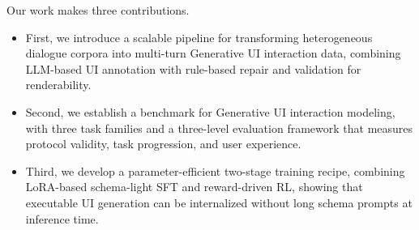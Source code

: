 Our work makes three contributions. 

\begin{itemize}
    \item First, we introduce a scalable pipeline for transforming heterogeneous dialogue corpora into multi-turn Generative UI interaction data, combining LLM-based UI annotation with rule-based repair and validation for renderability.
    \item Second, we establish a benchmark for Generative UI interaction modeling, with three task families and a three-level evaluation framework that measures protocol validity, task progression, and user experience.
    \item Third, we develop a parameter-efficient two-stage training recipe, combining LoRA-based schema-light SFT and reward-driven RL, showing that executable UI generation can be internalized without long schema prompts at inference time.
\end{itemize}
